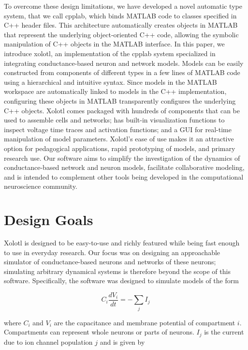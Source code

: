 \documentclass{frontiersSCNS} %
\begin{document}
To overcome these design limitations, we have developed a novel automatic type system, that we call cpplab, which binds MATLAB code to classes specified in C++ header files. This architecture automatically creates objects in MATLAB that represent the underlying object-oriented C++ code, allowing the symbolic manipulation of C++ objects in the MATLAB interface. In this paper, we introduce xolotl, an implementation of the cpplab system specialized in integrating conductance-based neuron and network models. Models can be easily constructed from components of different types in a few lines of MATLAB code using a hierarchical and intuitive syntax. Since models in the MATLAB workspace are automatically linked to models in the C++ implementation, configuring these objects in MATLAB transparently configures the underlying C++ objects. Xolotl comes packaged with hundreds of components that can be used to assemble cells and networks;  has built-in visualization functions to inspect voltage time traces and activation functions; and a GUI for real-time manipulation of model parameters. Xolotl's ease of use makes it an attractive option for pedagogical applications, rapid prototyping of models, and primary research use. Our software aims to simplify the investigation of the dynamics of conductance-based network and neuron models, facilitate collaborative modeling, and is intended to complement other tools being developed in the computational neuroscience community.


%
%
%
%
%
%

\section{Design Goals}
\label{design}

Xolotl is designed to be easy-to-use and richly featured while being fast enough to use in everyday research. Our focus was on designing an approachable simulator of conductance-based neurons and networks of these neurons; simulating arbitrary dynamical systems is therefore beyond the scope of this software. Specifically, the software was designed to simulate models of the form


\begin{equation}
C_{i}\frac{dV_{i}}{dt}=-\sum_{j}I_{j} \label{eq:1}
\end{equation}

where \( C_{i} \) and  \( V_{i} \) are the capacitance and membrane potential of compartment  \( i \). Compartments can represent whole neurons or parts of neurons.  \( I_{j} \) is the current due to ion channel population \( j \) and is given by
\end{document}
